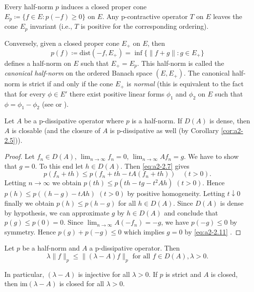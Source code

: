 \begin{remark}\label{rem:a2-2.8}
Every half-norm $p$ induces a closed proper cone \\
$E_{p} \coloneqq \{f \in E \colon p(-f) \geq 0\}$ on $E$.
Any p-contractive operator $T$ on $E$ leaves the cone $E_{p}$ invariant (i.e., $T$ is positive for the corresponding ordering).

Conversely, given a closed proper cone $E_{+}$ on $E$, then 
\[
p(f) \coloneqq \text{dist}(-f,E_{+}) = \inf\{\|f + g\| \colon g \in E_{+}\}
\]
defines a half-norm on $E$ such that $E_{+} = E_{p}$.
This half-norm is called the \emph{canonical half-norm} on the ordered Banach space $(E,E_{+})$.
The canonical half-norm is strict if and only if the cone $E_{+}$ is \emph{normal} (this is equivalent to the fact that for every $\phi \in E'$ there exist positive linear forms $\phi_{1}$ and $\phi_{2}$ on $E$ such that $\phi = \phi_{1} - \phi_{2}$ (see \citet{battyrobinson:1984} or \citet[Chapter V]{schaefer:1966}).
\end{remark}
\begin{proposition}\label{prop:a2-2.9}
Let $A$ be a p-dissipative operator where $p$ is a half-norm.
If $D(A)$ is dense, then $A$ is closable (and the closure of $A$ is p-dissipative as well (by Corollary \ref{cor:a2-2.5})). 
\end{proposition}

\begin{proof}
Let $f_n \in D(A)$, $\lim_{n \to \infty} f_{n} = 0$, $\lim_{n \to \infty} Af_{n} = g$.
We have to show that $g = 0$.
To this end let $h \in D(A)$.
Then \eqref{eq:a2-2.7}   
gives 
%	
\[
p(f_{n} + th) \leq p(f_{n} + th - tA(f_{n} + th)) \quad (t > 0) .
\]
%
Letting $n \to \infty$ we obtain 
$p(th) \leq p(th - tg - t^{2}Ah)$ \quad $(t > 0)$.
Hence $p(h) \leq p((h-g) - tAh)$ $(t > 0)$ by positive homogeneity.
Letting $t \downarrow 0$ finally we obtain $p(h) \leq p(h - g)$ for all $h \in D(A)$.
Since $D(A)$ is dense by hypothesis, we can approximate $g$ by $h \in D(A)$ and conclude that $p(g) \leq p(0) = 0$.
Since $\lim_{n\to\infty} A(-f_{n}) = -g$, we have $p(-g) \leq 0$ by symmetry.
Hence $p(g) + p(-g) \leq 0$ which implies $g = 0$ by \eqref{eq:a2-2.11} . 
\end{proof}

\begin{lemma}\label{lem:a2-2.10}
Let $p$ be a half-norm and $A$ a p-dissipative operator.
Then
\begin{equation}\label{eq:a2-2.14}
\lambda\|f\|_{p} \leq \|(\lambda - A)f\|_{p} \text{ for all } f \in D(A), \lambda > 0.
\end{equation}

In particular, $(\lambda-A)$ is injective for all $\lambda > 0$.
If $p$ is strict and $A$ is closed, then $\text{im}(\lambda - A)$ is closed for all $\lambda > 0$.
\end{lemma}

